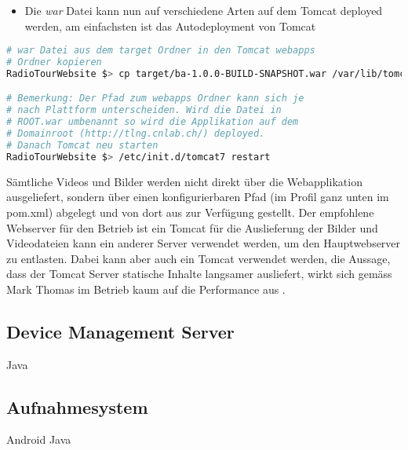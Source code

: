\begin{itemize}
\item Die \textit{war} Datei kann nun auf verschiedene Arten auf dem Tomcat deployed werden, am einfachsten ist das Autodeployment von Tomcat
\end{itemize}
\begin{lstlisting}[language=Bash, caption=Deployment auf Tomcat]
# war Datei aus dem target Ordner in den Tomcat webapps
# Ordner kopieren
RadioTourWebsite $> cp target/ba-1.0.0-BUILD-SNAPSHOT.war /var/lib/tomcat7/webapps/ROOT.war

# Bemerkung: Der Pfad zum webapps Ordner kann sich je
# nach Plattform unterscheiden. Wird die Datei in
# ROOT.war umbenannt so wird die Applikation auf dem
# Domainroot (http://tlng.cnlab.ch/) deployed.
# Danach Tomcat neu starten
RadioTourWebsite $> /etc/init.d/tomcat7 restart

\end{lstlisting}

Sämtliche Videos und Bilder werden nicht direkt über die Webapplikation ausgeliefert, sondern über einen konfigurierbaren Pfad (im Profil ganz unten im pom.xml) abgelegt und von dort aus zur Verfügung gestellt. Der empfohlene Webserver für den Betrieb ist ein Tomcat für die Auslieferung der Bilder und Videodateien kann ein anderer Server verwendet werden, um den Hauptwebserver zu entlasten. Dabei kann aber auch ein Tomcat verwendet werden, die Aussage, dass der Tomcat Server statische Inhalte langsamer ausliefert, wirkt sich gemäss Mark Thomas im Betrieb kaum auf die Performance aus \cite{thomas2010}.

\subsection{Device Management Server}
Java

\subsection{Aufnahmesystem}
Android Java
